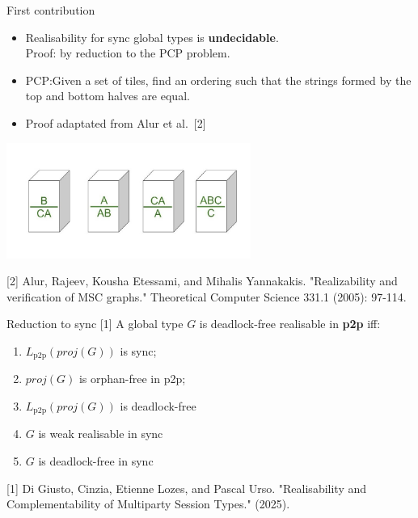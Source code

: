 \documentclass{beamer}
\begin{document}
\begin{frame}[fragile]{First contribution}

	\vspace{1em}

	\begin{itemize}
		\item Realisability for sync global types is
    \textbf{undecidable}. \\ Proof: by reduction to the PCP problem.
    \item PCP:Given a set of tiles, find an ordering such that the
    strings formed by the top and bottom halves are equal.
    \item Proof adaptated from Alur et al.~[2]
	\end{itemize}

	\begin{center}
		\includegraphics[width=0.6\textwidth]{../img/pcp.jpg}
	\end{center}

	\small{[2] Alur, Rajeev, Kousha Etessami, and Mihalis Yannakakis. "Realizability and verification of MSC graphs." Theoretical Computer Science 331.1 (2005): 97-114.}
\end{frame}

\begin{frame}{Reduction to sync [1]}
	\vspace{1.5cm}
	A global type $G$ is deadlock-free realisable in \textbf{p2p} iff:
	\begin{enumerate}
		\item $L_{\text{p2p}}(proj(G))$ is sync;
		\item $proj(G)$ is orphan-free in p2p; %
		\item $L_{\text{p2p}}(proj(G))$ is deadlock-free
		\item $G$ is weak realisable in sync
		\item $G$ is deadlock-free in sync \hspace{4mm} \scalebox{1.5}{{\color{red}$\longleftarrow$}}
	\end{enumerate}
	
	\vspace{1.5cm}

	\small{[1] Di Giusto, Cinzia, Etienne Lozes, and Pascal Urso. "Realisability and Complementability of Multiparty Session Types." (2025).}
\end{frame}
\end{document}
